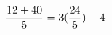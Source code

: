 \documentclass[preview]{standalone}
\begin{document}
\begin{align*}
\special{dvisvgm:raw <g id='unique000'>}\frac{12 + 40}{5} = 3(\frac{24}{5}) - 4\special{dvisvgm:raw </g>}
\end{align*}
\end{document}
